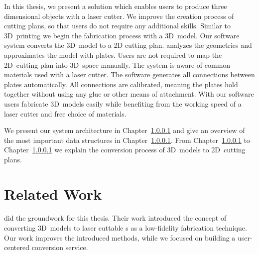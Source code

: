 \documentclass[../ClassicThesis.tex]{subfiles}
\begin{document}

In this thesis, we present a solution which enables users to
produce three dimensional objects with a laser cutter. We
improve the creation process of cutting plans, so that users
do not require any additional skills. Similar to 3D~printing
we begin the fabrication process with a 3D~model.
Our software system {\platener} converts the 3D~model to a
2D cutting plan. {\platener} analyzes the geometries and
approximates the model with plates. Users are not required
to map the 2D~cutting plan into 3D~space manually. The
system is aware of common materials used with a laser
cutter. The software generates all connections between
plates automatically. All connections are calibrated,
meaning the plates hold together without using any glue or
other means of attachment. With our software users fabricate
3D~models easily while benefiting from the working speed of
a laser cutter and free choice of materials.




We present our system architecture in Chapter~\ref{} and give an
overview of the most important data structures in Chapter~\ref{}. From
Chapter~\ref{} to Chapter~\ref{} we explain the conversion process of
3D~models to 2D~cutting plans.

\section{Related Work}
\label{sec:related-work}

\paragraph{{\platener}} \citeauthor{master-thesis} did the groundwork
for this thesis. Their work introduced the concept of converting
3D~models to laser cuttable {\svgfile}s as a low-fidelity fabrication
technique. Our work improves the introduced methods, while we focused
on building a user-centered conversion service.
\end{document}
